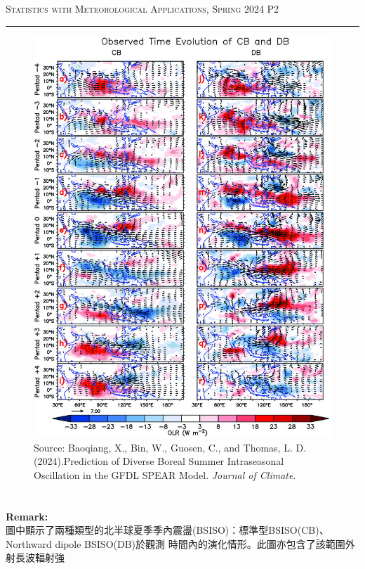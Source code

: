 \documentclass{article}
\begin{document}
\begin{CJK*}{UTF8}{bsmi}
\newpage
\thispagestyle{empty}
\hfill {\scshape \large Statistics with Meteorological Applications, Spring 2024} \hfill {\scshape P2}
\smallskip
\hrule    
\bigskip
\bigskip

\begin{figure}[h]
    \centering
    \includegraphics[width=12cm]{full-JCLI-D-23-0601.1-f2.jpg}
    \caption{Source: Baoqiang, X., Bin, W., Guosen, C., and Thomas, L. D.(2024).Prediction of Diverse 
    Boreal Summer Intraseasonal Oscillation in the GFDL SPEAR Model. \emph{Journal of Climate}.}
\end{figure}

\section*{}
    \begin{spacing}{2.5}
        \begin{large}
            \textbf{Remark:\\}
            圖中顯示了兩種類型的北半球夏季季內震盪(BSISO)：標準型BSISO(CB)、Northward dipole BSISO(DB)於觀測
            時間內的演化情形。此圖亦包含了該範圍外射長波輻射強
        \end{large}
    \end{spacing}


\end{CJK*}
\end{document}
